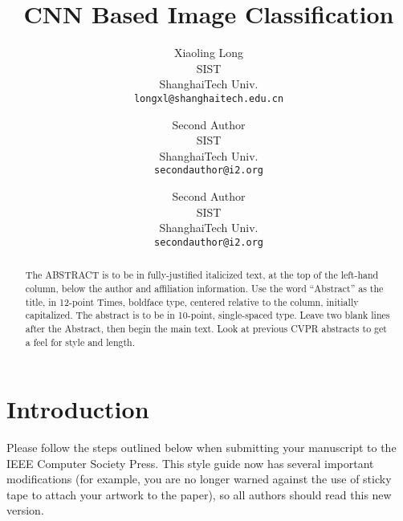 \documentclass[10pt,twocolumn,letterpaper]{article}
\begin{document}
\title{	CNN Based Image Classification}

\author{Xiaoling Long\\
SIST\\
ShanghaiTech Univ.\\
{\tt\small longxl@shanghaitech.edu.cn}
\and
Second Author\\
SIST\\
ShanghaiTech Univ.\\
{\tt\small secondauthor@i2.org}
\and
Second Author\\
SIST\\
ShanghaiTech Univ.\\
{\tt\small secondauthor@i2.org}
}


\maketitle

\begin{abstract}
   The ABSTRACT is to be in fully-justified italicized text, at the top
   of the left-hand column, below the author and affiliation
   information. Use the word ``Abstract'' as the title, in 12-point
   Times, boldface type, centered relative to the column, initially
   capitalized. The abstract is to be in 10-point, single-spaced type.
   Leave two blank lines after the Abstract, then begin the main text.
   Look at previous CVPR abstracts to get a feel for style and length.
\end{abstract}

\section{Introduction}

Please follow the steps outlined below when submitting your manuscript to
the IEEE Computer Society Press.  This style guide now has several
important modifications (for example, you are no longer warned against the
use of sticky tape to attach your artwork to the paper), so all authors
should read this new version.

\end{document}
